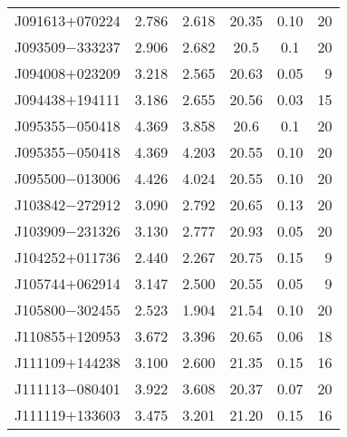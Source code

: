 \begin{table}
\begin{center}
{\begin{tabular}{lccccr}
 J091613$+$070224 &      2.786 &                    2.618 &                   20.35 &               0.10 &                20 \\
 J093509$-$333237 &      2.906 &                    2.682 &                    20.5 &                0.1 &                20 \\
 J094008$+$023209 &      3.218 &                    2.565 &                   20.63 &               0.05 &                 9 \\
 J094438$+$194111 &      3.186 &                    2.655 &                   20.56 &               0.03 &                15 \\
 J095355$-$050418 &      4.369 &                    3.858 &                   20.6  &               0.1  &                20 \\
 J095355$-$050418 &      4.369 &                    4.203 &                   20.55 &               0.10 &                20 \\
 J095500$-$013006 &      4.426 &                    4.024 &                   20.55 &               0.10 &                20 \\
 J103842$-$272912 &      3.090 &                    2.792 &                   20.65 &               0.13 &                20 \\
 J103909$-$231326 &      3.130 &                    2.777 &                   20.93 &               0.05 &                20 \\
 J104252$+$011736 &      2.440 &                    2.267 &                   20.75 &               0.15 &                 9 \\
 J105744$+$062914 &      3.147 &                    2.500 &                   20.55 &               0.05 &                 9 \\
 J105800$-$302455 &      2.523 &                    1.904 &                   21.54 &               0.10 &                20 \\
 J110855$+$120953 &      3.672 &                    3.396 &                   20.65 &               0.06 &                18 \\
 J111109$+$144238 &      3.100 &                    2.600 &                   21.35 &               0.15 &                16 \\
 J111113$-$080401 &      3.922 &                    3.608 &                   20.37 &               0.07 &                20 \\
 J111119$+$133603 &      3.475 &                    3.201 &                   21.20 &               0.15 &                16 \\

\end{tabular}}
\end{center}
\end{table}
